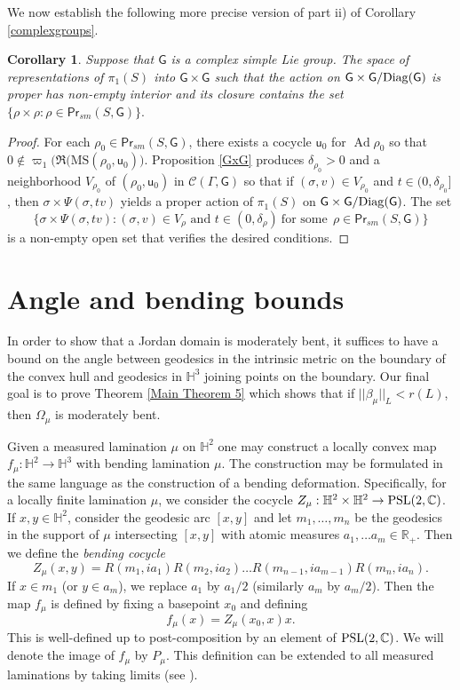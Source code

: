 \documentclass{amsart}
\theoremstyle{plain}
\newtheorem{corollary}[proposition]{Corollary}
\theoremstyle{definition}
\theoremstyle{remark}
\newcommand{\CC}{\mathbb C}
\newcommand{\R}{\mathbb R}
\newcommand{\Hp}{{\mathbb H}^2}
\newcommand{\Hs}{{{\mathbb H}^3}}
\newcommand{\psl}{{\rm PSL}(2,\CC)}
\newcommand{\Ad}{\operatorname{Ad}}
\renewcommand{\P}{{\sf{Pr}}}
\renewcommand{\sf}[1]{{\mathsf{#1}}}
\newcommand{\<}{\left <}
\renewcommand{\>}{\right >}
\newcommand{\M}{\mathrm{MS}}
\newcommand{\co}{\sf u}
\begin{document}
We now establish the following more precise version of part ii) of Corollary \ref{complexgroups}.


\begin{corollary} Suppose that $\sf G$ is a  complex simple Lie group. 
The space of representations of $\pi_1(S)$ into $\sf G\times\sf G$ such that the action on $\sf G\times\sf G/\rm{Diag}(\sf G)$ 
is proper has non-empty interior and its closure contains the set $\{\rho\times\rho:\rho\in\P_{sm}(S,\sf G)\}.$
\end{corollary}

\begin{proof} 
For each $\rho_0\in\P_{sm}(S,\sf G)$, there exists a cocycle $\co_0$ for $\Ad\rho_0$ so that 
$0\notin\varpi_1\big(\Re(\M(\rho_0,\co_0)\big)$.
Proposition \ref{GxG} produces $\delta_{\rho_0}>0$ and a neighborhood $V_{\rho_0}$ of $(\rho_0,\co_0)$ in $\mathcal C(\Gamma,\sf G)$
so that if $(\sigma,v)\in V_{\rho_0}$ and $t\in (0,\delta_{\rho_0}]$, then
$\sigma\times\Psi(\sigma,tv)$ yields a proper action of $\pi_1(S)$ on $\sf G\times\sf G/\rm{Diag}(\sf G)$.
The set 
$$\{\sigma\times\Psi(\sigma,tv):  (\sigma,v)\in V_\rho\text{ and }t\in(0,\delta_\rho) \ \text{for some}\ \ \rho\in \P_{sm}(S,\sf G)\}$$
 is a non-empty open set that verifies the desired conditions.
\end{proof}







\section{Angle  and bending bounds}

In order to show that a Jordan domain is moderately bent, it suffices to have a bound on the angle between
geodesics in the intrinsic metric on the boundary of the convex hull and geodesics in $\mathbb H^3$ joining points on the boundary.
Our final goal is to prove Theorem \ref{Main Theorem 5} which shows that if $||\beta_\mu||_L<r(L)$, then $\Omega_\mu$ is moderately bent.

Given  a measured lamination $\mu$ on $\Hp$ one may  construct a locally convex map $f_\mu:\Hp \rightarrow \Hs$ with bending lamination $\mu$.
The construction may be formulated in the same language as the construction of a bending deformation.  Specifically, for a locally finite 
lamination $\mu$, we consider the cocycle $Z_\mu: \Hp\times\Hp \rightarrow \psl$. 
If $x, y \in \Hp$, consider the geodesic arc $[x,y]$ and  let $m_1,\ldots, m_n$ be the geodesics in the support of 
$ \mu$ intersecting $ [ x, y]$ with  atomic measures $a_1,\ldots a_m \in \R_+$. Then we define the {\em bending cocycle}
$$Z_\mu(x,y) = R(m_1,ia_1)R(m_2,ia_2)\ldots R(m_{n-1},ia_{m-1})R(m_n,ia_n).$$
If $x \in m_1$ (or $y \in a_m$), we replace $a_1$ by $a_1/2$ (similarly $a_m$ by $a_m/2$).
Then the map $f_\mu$ is defined by fixing a basepoint $x_0$ and defining
$$f_\mu(x) = Z_\mu(x_0,x)x.$$
This is well-defined up to post-composition by an element of $\psl$. We will denote  the image of  $f_\mu$ by $P_\mu$. 
This definition can be extended to all measured laminations by taking limits (see \cite[Chapter II.3]{EM}).  
\end{document}
